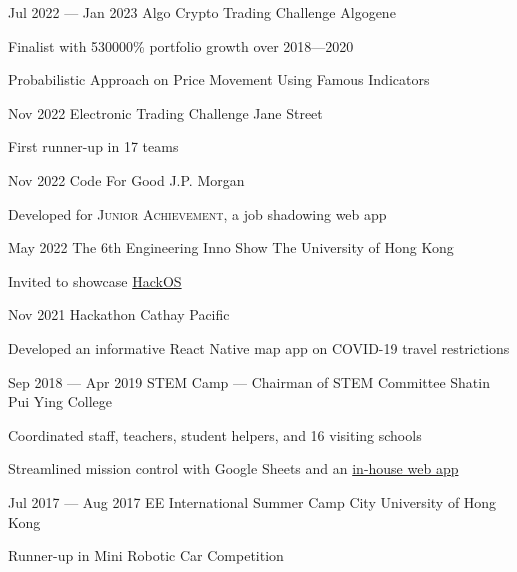 \activityEntry
{Jul 2022 --- Jan 2023}
{Algo Crypto Trading Challenge}
{Algogene}
{
\begin{descitemize}
    \specialitem Finalist with 530000\% portfolio growth over 2018---2020
    \item Probabilistic Approach on Price Movement Using Famous Indicators
\end{descitemize}
}

\activityEntry
{Nov 2022}
{Electronic Trading Challenge}
{Jane Street}
{
\begin{descitemize}
    \specialitem First runner-up in 17 teams
\end{descitemize}
}

\activityEntry
{Nov 2022}
{Code For Good}
{J.P. Morgan}
{
\begin{descitemize}
    \item Developed for {\scshape Junior Achievement}, a job shadowing web app
\end{descitemize}
}

\activityEntry
{May 2022}
{The 6th Engineering Inno Show}
{The University of Hong Kong}
{
\begin{descitemize}
    \item Invited to showcase \hyperlink{HackOS}{HackOS}
\end{descitemize}
}

\activityEntry
{Nov 2021}
{Hackathon}
{Cathay Pacific}
{
\begin{descitemize}
    \item Developed an informative React Native map app on COVID-19 travel restrictions
\end{descitemize}
}

\activityEntry
{Sep 2018 --- Apr 2019}
{\hypertarget{STEM_Camp_2019}{STEM Camp --- Chairman of STEM Committee}}
{Shatin Pui Ying College}
{
\begin{descitemize}
    \specialitem Coordinated staff, teachers, student helpers, and 16 visiting schools
    \item Streamlined mission control with Google Sheets and an \hyperlink{RTRMS}{in-house web app}
\end{descitemize}
}

\activityEntry
{Jul 2017 --- Aug 2017}
{EE International Summer Camp}
{City University of Hong Kong}
{
\begin{descitemize}
    \specialitem Runner-up in Mini Robotic Car Competition
\end{descitemize}
}
